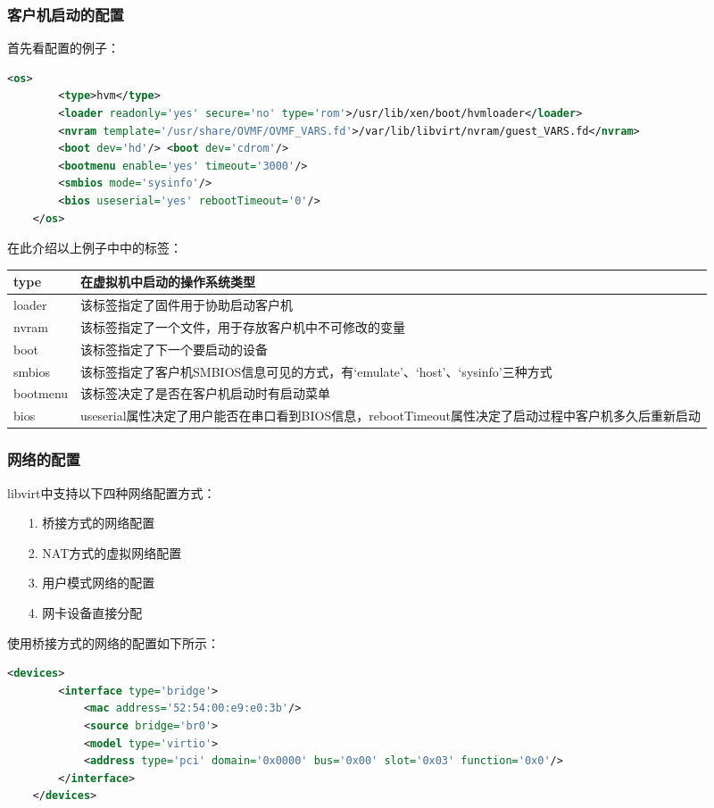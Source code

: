 \documentclass[a4paper,left=2.5cm,right=2.5cm,11pt]{article}
\newcommand{\interval}{\vspace{0.5em}}
\begin{document}
\subsubsection{客户机启动的配置}
	首先看配置的例子：
	\begin{lstlisting}[language = XML]
	<os>
		<type>hvm</type>
		<loader readonly='yes' secure='no' type='rom'>/usr/lib/xen/boot/hvmloader</loader>
		<nvram template='/usr/share/OVMF/OVMF_VARS.fd'>/var/lib/libvirt/nvram/guest_VARS.fd</nvram>
		<boot dev='hd'/> <boot dev='cdrom'/>
		<bootmenu enable='yes' timeout='3000'/>
		<smbios mode='sysinfo'/>
		<bios useserial='yes' rebootTimeout='0'/>
	</os>
	\end{lstlisting}

	在此介绍以上例子中中的标签：
	\interval
	\begin{longtable}{p{2.5cm}p{10cm}}
	\hline
	type & 在虚拟机中启动的操作系统类型 \\
	\hline
	loader & 该标签指定了固件用于协助启动客户机 \\
	\hline
	nvram & 该标签指定了一个文件，用于存放客户机中不可修改的变量 \\
	\hline
	boot & 该标签指定了下一个要启动的设备 \\
	\hline
	smbios & 该标签指定了客户机SMBIOS信息可见的方式，有‘emulate’、‘host’、‘sysinfo’三种方式 \\
	\hline
	bootmenu & 该标签决定了是否在客户机启动时有启动菜单 \\
	\hline
	bios & useserial属性决定了用户能否在串口看到BIOS信息，rebootTimeout属性决定了启动过程中客户机多久后重新启动 \\
	\hline
	\end{longtable}

\subsubsection{网络的配置}
	libvirt中支持以下四种网络配置方式：
	\begin{itemize}
		\item[1.] 桥接方式的网络配置
		\item[2.] NAT方式的虚拟网络配置
		\item[3.] 用户模式网络的配置
		\item[4.] 网卡设备直接分配
	\end{itemize}

	使用桥接方式的网络的配置如下所示：
	\begin{lstlisting}[language = XML]
	<devices>
		<interface type='bridge'>
			<mac address='52:54:00:e9:e0:3b'/>
			<source bridge='br0'>
			<model type='virtio'>
			<address type='pci' domain='0x0000' bus='0x00' slot='0x03' function='0x0'/>
		</interface>
	</devices>
	\end{lstlisting}
\end{document}
